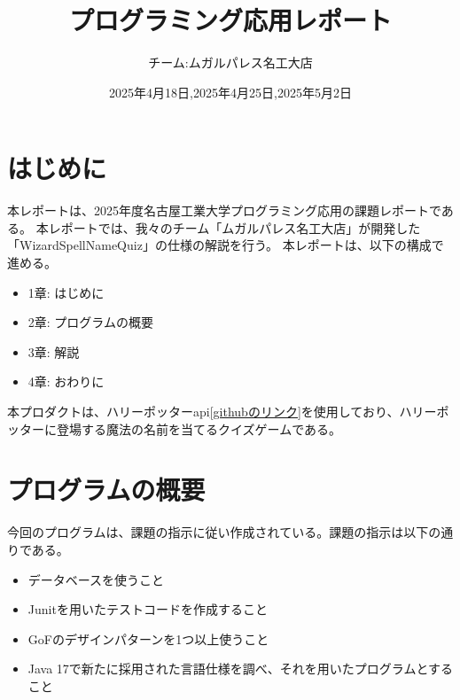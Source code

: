 \documentclass[uplatex,dvipdfmx,a4paper]{jsarticle}
\title{プログラミング応用レポート}
\author{チーム:ムガルパレス名工大店}
\date{2025年4月18日,2025年4月25日,2025年5月2日}
\begin{document}
\maketitle

\section{はじめに}
本レポートは、2025年度名古屋工業大学プログラミング応用の課題レポートである。
本レポートでは、我々のチーム「ムガルパレス名工大店」が開発した「WizardSpellNameQuiz」の仕様の解説を行う。
本レポートは、以下の構成で進める。
\begin{itemize}
  \item 1章: はじめに
  \item 2章: プログラムの概要
  \item 3章: 解説
  \item 4章: おわりに
\end{itemize}
本プロダクトは、ハリーポッターapi\href{https://github.com/KostaSav/hp-api}{[githubのリンク]}を使用しており、ハリーポッターに登場する魔法の名前を当てるクイズゲームである。

\section{プログラムの概要}

今回のプログラムは、課題の指示に従い作成されている。課題の指示は以下の通りである。
\begin{itemize}
  \item データベースを使うこと
  \item Junitを用いたテストコードを作成すること
  \item GoFのデザインパターンを1つ以上使うこと
  \item Java 17で新たに採用された言語仕様を調べ、それを用いたプログラムとすること%
  \end{itemize}
\end{document}
